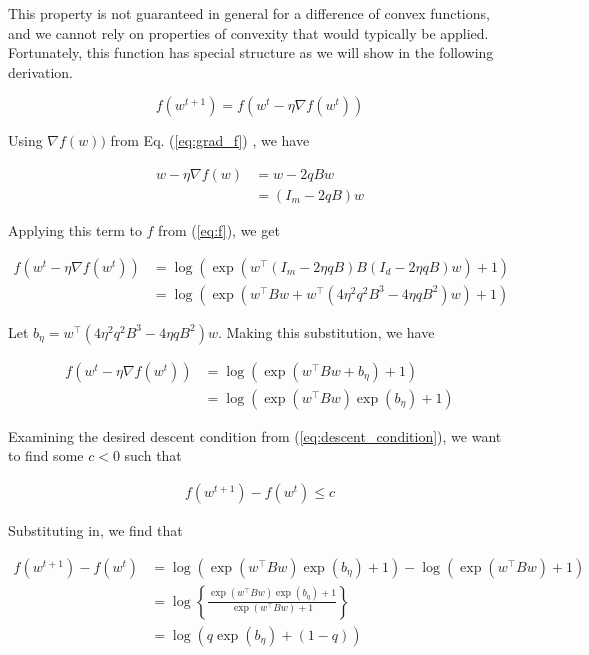 \documentclass[11pt]{article}
\begin{document}
This property is not guaranteed in general for a difference of convex functions, and we cannot rely on properties of convexity that would typically be applied. Fortunately, this function has special structure as we will show in the following derivation.

\begin{equation}
    f(w^{t+1}) = f(w^t - \eta \nabla f(w^t)) 
\end{equation}

Using $\nabla f(w))$ from Eq. (\ref{eq:grad_f}) , we have

\begin{align*}
    w - \eta \nabla f(w) &= w - 2qBw \\
    &= (I_m - 2qB)w
\end{align*}

Applying this term to $f$ from (\ref{eq:f}), we get

\begin{equation}
\begin{split}
    f(w^t - \eta \nabla f(w^t)) 
    &= \log(\exp(w^{\top}(I_m - 2 \eta qB)B(I_d - 2 \eta qB)w) + 1) \\
    &= \log(\exp(w^{\top}Bw + w^{\top} ( 4 \eta^2 q^2 B^3 - 4 \eta q B^2)w) + 1)
\end{split}
\end{equation}

Let $b_\eta = w^{\top} ( 4 \eta^2 q^2 B^3 - 4 \eta q B^2)w$. Making this substitution, we have

\begin{equation}
\begin{split}
    f(w^t - \eta \nabla f(w^t)) 
    &= \log(\exp(w^{\top}Bw + b_\eta ) + 1) \\
    &= \log(\exp(w^{\top}Bw)\exp(b_\eta ) + 1)
\end{split}
\end{equation}

Examining the desired descent condition from (\ref{eq:descent_condition}), we want to find some $c < 0$ such that

\begin{align*}
    f(w^{t+1}) - f(w^t) \leq c
\end{align*}

Substituting in, we find that

\begin{align*}
    f(w^{t+1}) - f(w^t) &= 
    \log(\exp(w^{\top}Bw)\exp(b_\eta ) + 1) - \log(\exp(w^{\top}Bw) + 1) \\
    &= \log \left\{ \frac{\exp(w^{\top}Bw)\exp(b_\eta ) + 1}{\exp(w^{\top}Bw) + 1} \right\} \\
    &= \log( q \exp(b_\eta ) + (1 - q))
\end{align*}
\end{document}
